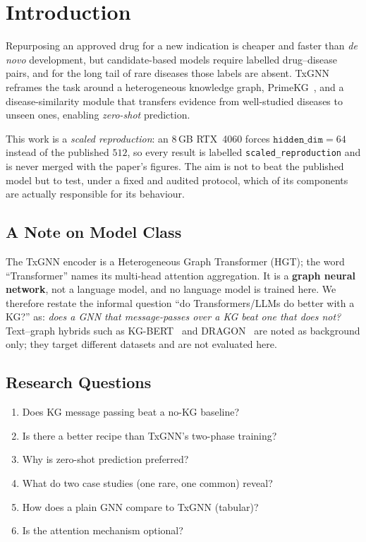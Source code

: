 \documentclass[conference]{IEEEtran}
\begin{document}
\section{Introduction}
Repurposing an approved drug for a new indication is cheaper and faster than
\emph{de novo} development, but candidate-based models require labelled
drug--disease pairs, and for the long tail of rare diseases those labels are
absent. TxGNN~\cite{huang2024} reframes the task around a heterogeneous knowledge
graph, PrimeKG~\cite{chandak2023}, and a disease-similarity module that transfers
evidence from well-studied diseases to unseen ones, enabling \emph{zero-shot}
prediction.

This work is a \emph{scaled reproduction}: an 8\,GB RTX~4060 forces
$\texttt{hidden\_dim}=64$ instead of the published $512$, so every result is
labelled \texttt{scaled\_reproduction} and is never merged with the paper's
figures. The aim is not to beat the published model but to test, under a fixed
and audited protocol, which of its components are actually responsible for its
behaviour.

\subsection{A Note on Model Class}
The TxGNN encoder is a Heterogeneous Graph Transformer (HGT); the word
``Transformer'' names its multi-head attention aggregation. It is a
\textbf{graph neural network}, not a language model, and no language model is
trained here. We therefore restate the informal question ``do Transformers/LLMs
do better with a KG?'' as: \emph{does a GNN that message-passes over a KG beat
one that does not?} Text--graph hybrids such as KG-BERT~\cite{kgbert2019} and
DRAGON~\cite{dragon2022} are noted as background only; they target different
datasets and are not evaluated here.

\subsection{Research Questions}
\begin{enumerate}
\item Does KG message passing beat a no-KG baseline?
\item Is there a better recipe than TxGNN's two-phase training?
\item Why is zero-shot prediction preferred?
\item What do two case studies (one rare, one common) reveal?
\item How does a plain GNN compare to TxGNN (tabular)?
\item Is the attention mechanism optional?
\end{enumerate}
\end{document}
